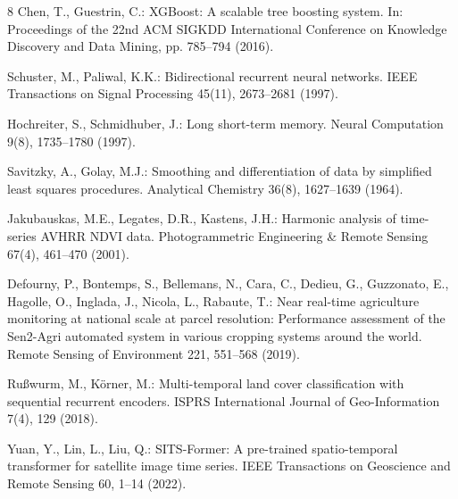 \documentclass[runningheads]{llncs}
\begin{document}
\begin{thebibliography}{8}
Chen, T., Guestrin, C.: XGBoost: A scalable tree boosting system. In: Proceedings of the 22nd ACM SIGKDD International Conference on Knowledge Discovery and Data Mining, pp. 785--794 (2016).

Schuster, M., Paliwal, K.K.: Bidirectional recurrent neural networks. IEEE Transactions on Signal Processing 45(11), 2673--2681 (1997).

Hochreiter, S., Schmidhuber, J.: Long short-term memory. Neural Computation 9(8), 1735--1780 (1997).

Savitzky, A., Golay, M.J.: Smoothing and differentiation of data by simplified least squares procedures. Analytical Chemistry 36(8), 1627--1639 (1964).

Jakubauskas, M.E., Legates, D.R., Kastens, J.H.: Harmonic analysis of time-series AVHRR NDVI data. Photogrammetric Engineering \& Remote Sensing 67(4), 461--470 (2001).

Defourny, P., Bontemps, S., Bellemans, N., Cara, C., Dedieu, G., Guzzonato, E., Hagolle, O., Inglada, J., Nicola, L., Rabaute, T.: Near real-time agriculture monitoring at national scale at parcel resolution: Performance assessment of the Sen2-Agri automated system in various cropping systems around the world. Remote Sensing of Environment 221, 551--568 (2019).

Ru\ss wurm, M., K\"orner, M.: Multi-temporal land cover classification with sequential recurrent encoders. ISPRS International Journal of Geo-Information 7(4), 129 (2018).

Yuan, Y., Lin, L., Liu, Q.: SITS-Former: A pre-trained spatio-temporal transformer for satellite image time series. IEEE Transactions on Geoscience and Remote Sensing 60, 1--14 (2022).

\end{thebibliography}
\end{document}
